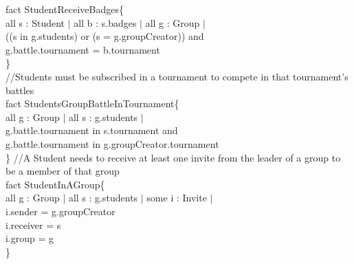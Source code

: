 \documentclass{article}
\begin{document}
{\color{black}
\color{blue} fact \color{black} StudentReceiveBadges\{\\
\-\hspace{1cm} \color{blue} all \color{black} s : Student $|$ \color{blue} all \color{black} b : s.badges $|$ \color{blue} all \color{black} g : Group $|$  \\
\-\hspace{1cm} ((s \color{blue} in \color{black} g.students) \color{blue} or \color{black} (s \color{blue} = \color{black} g.groupCreator)) \color{blue} and \color{black}\\
\-\hspace{1cm} g.battle.tournament \color{blue} = \color{black} b.tournament\\
\}\\

\color{gray}
\noindent//Students must be subscribed in a tournament to compete in that tournament's battles\\
\color{black}
\color{blue} fact \color{black} StudentsGroupBattleInTournament\{\\
\-\hspace{1cm} \color{blue} all \color{black} g : Group $|$ \color{blue} all \color{black} s : g.students $|$ \\
\-\hspace{1cm} g.battle.tournament \color{blue} in \color{black} s.tournament \color{blue} and \color{black} \\
\-\hspace{1cm} g.battle.tournament \color{blue} in \color{black} g.groupCreator.tournament\\
\}
\newpage
\noindent
\color{gray}
//A Student needs to receive at least one invite from the leader of a group to be a member of that group\\
\color{black}
\color{blue} fact \color{black} StudentInAGroup\{\\
\-\hspace{1cm} \color{blue} all \color{black} g : Group $|$ \color{blue} all \color{black} s : g.students $|$ \color{blue} some \color{black} i : Invite $|$\\
\-\hspace{1cm} i.sender \color{blue} = \color{black} g.groupCreator\\
\-\hspace{1cm} i.receiver \color{blue} = \color{black} s \\
\-\hspace{1cm} i.group \color{blue} = \color{black} g\\
\}\\


}
\end{document}
